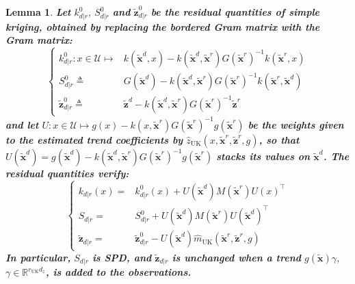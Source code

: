 \documentclass[preprint]{elsarticle}
\newtheorem{lemma}{Lemma}
\begin{document}
\begin{lemma}
    \textbf{Let} $k^0_{d|r}$, $S^0_{d|r}$ \textbf{and} $\tilde{\mathbf{z}}^0_{d|r}$ \textbf{be the residual quantities of simple kriging, obtained by replacing the bordered Gram matrix with the Gram matrix:}
    \begin{equation*}
        \left\{\begin{aligned}
        k^0_{d|r}:x\in\mathcal{U}\mapsto&k(\tilde{\mathbf{x}}^d,x)-k(\tilde{\mathbf{x}}^d,\tilde{\mathbf{x}}^r)G(\tilde{\mathbf{x}}^r)^{-1}k(\tilde{\mathbf{x}}^r,x)\\
        S^0_{d|r}\triangleq&G(\tilde{\mathbf{x}}^d)-k(\tilde{\mathbf{x}}^d,\tilde{\mathbf{x}}^r)G(\tilde{\mathbf{x}}^r)^{-1}k(\tilde{\mathbf{x}}^r,\tilde{\mathbf{x}}^d)\\
        \tilde{\mathbf{z}}^0_{d|r}\triangleq&\tilde{\mathbf{z}}^d-k(\tilde{\mathbf{x}}^d,\tilde{\mathbf{x}}^r)G(\tilde{\mathbf{x}}^r)^{-1}\tilde{\mathbf{z}}^r
        \end{aligned}\right.
    \end{equation*}
    \textbf{and let} $U:x\in\mathcal{U}\mapsto g(x)-k(x,\tilde{\mathbf{x}}^r)G(\tilde{\mathbf{x}}^r)^{-1}g(\tilde{\mathbf{x}}^r)$ \textbf{be the weights given to the estimated trend coefficients by} $\hat{z}_{\mathrm{UK}}(x,\tilde{\mathbf{x}}^r,\tilde{\mathbf{z}}^r,g)$\textbf{, so that} $U(\tilde{\mathbf{x}}^d)=g(\tilde{\mathbf{x}}^d)-k(\tilde{\mathbf{x}}^d,\tilde{\mathbf{x}}^r)G(\tilde{\mathbf{x}}^r)^{-1}g(\tilde{\mathbf{x}}^r)$ \textbf{stacks its values on} $\tilde{\mathbf{x}}^d$\textbf{. The residual quantities verify:}
    \begin{equation*}
        \left\{\begin{aligned}
        k_{d|r}(x)=&k^0_{d|r}(x)+U(\tilde{\mathbf{x}}^d)M(\tilde{\mathbf{x}}^r)U(x)^\top\\
        S_{d|r}=&S^0_{d|r}+U(\tilde{\mathbf{x}}^d)M(\tilde{\mathbf{x}}^r)U(\tilde{\mathbf{x}}^d)^\top\\
        \tilde{\mathbf{z}}_{d|r}=&\tilde{\mathbf{z}}^0_{d|r}-U(\tilde{\mathbf{x}}^d)\hat{m}_{\mathrm{UK}}(\tilde{\mathbf{x}}^r,\tilde{\mathbf{z}}^r,g)
        \end{aligned}\right.
    \end{equation*}
    \textbf{In particular,} $S_{d|r}$ \textbf{is SPD, and} $\tilde{\mathbf{z}}_{d|r}$ \textbf{is unchanged when a trend} $g(\tilde{\mathbf{x}})\gamma$, $\gamma\in\mathbb{R}^{r_{\mathrm{UK}}d_z}$\textbf{, is added to the observations.}\label{th:explicit_residuals}
\end{lemma}
\end{document}
